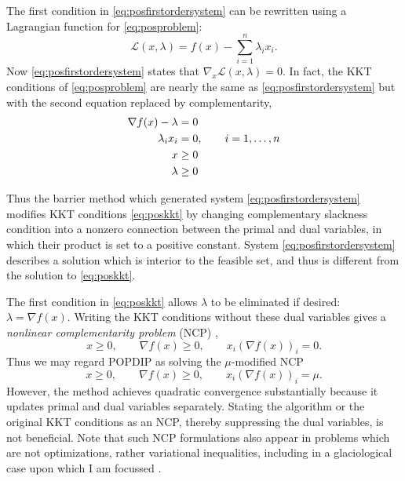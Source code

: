 \documentclass[11pt]{article}
\newcommand{\grad}{\nabla}
\begin{document}
The first condition in \eqref{eq:posfirstordersystem} can be rewritten using a Lagrangian function for \eqref{eq:posproblem}:
\begin{equation}
\mathcal{L}(x,\lambda) = f(x) - \sum_{i=1}^n \lambda_i x_i.  \label{eq:poslagrangian}
\end{equation}
Now \eqref{eq:posfirstordersystem} states that $\grad_x \mathcal{L}(x,\lambda)=0$.  In fact, the KKT conditions \cite[sections 14.4, 14.5]{GrivaNashSofer2009} of \eqref{eq:posproblem} are nearly the same as \eqref{eq:posfirstordersystem} but with the second equation replaced by complementarity,
\begin{align}
\grad f(x) - \lambda &= 0 \label{eq:poskkt} \\
\lambda_i x_i &= 0, \qquad i=1,\dots,n \notag \\
x &\ge 0 \notag \\
\lambda &\ge 0 \notag
\end{align}

Thus the barrier method which generated system \eqref{eq:posfirstordersystem} modifies KKT conditions \eqref{eq:poskkt} by changing complementary slackness condition into a nonzero connection between the primal and dual variables, in which their product is set to a positive constant.  System \eqref{eq:posfirstordersystem} describes a solution which is interior to the feasible set, and thus is different from the solution to \eqref{eq:poskkt}.

The first condition in \eqref{eq:poskkt} allows $\lambda$ to be eliminated if desired: $\lambda = \grad f(x)$.  Writing the KKT conditions without these dual variables gives a \emph{nonlinear complementarity problem} (NCP) \cite{FacchineiPang2007},
\begin{equation}
x \ge 0, \qquad \grad f(x) \ge 0, \qquad x_i (\grad f(x))_i = 0.  \label{eq:posncp}
\end{equation}
Thus we may regard POPDIP as solving the $\mu$-modified NCP
\begin{equation}
x \ge 0, \qquad \grad f(x) \ge 0, \qquad x_i (\grad f(x))_i = \mu. \label{eq:mumodifiedncp}
\end{equation}
However, the method achieves quadratic convergence substantially because it updates primal and dual variables separately.  Stating the algorithm or the original KKT conditions as an NCP, thereby suppressing the dual variables, is not beneficial.  Note that such NCP formulations also appear in problems which are not optimizations, rather variational inequalities, including in a glaciological case upon which I am focussed \cite{Bueler2016}.
\end{document}

